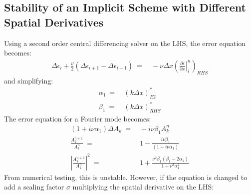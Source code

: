 \documentclass[conf]{new-aiaa}
\begin{document}
{\subsection{Stability of an Implicit Scheme with Different Spatial Derivatives}
{\label{sec:Appendix:Scaling_Fac}
%
Using a second order central differencing solver on the LHS, the error equation becomes:
\begin{equation}
	\begin{split}
		\label{eq:Error_Equation_LHS_neq_RHS}
  			\Delta{\epsilon_i}+\frac{\nu}{2}\left(\Delta{\epsilon_{i+1}}-\Delta{\epsilon_{i-1}}\right) ~=&~-{\nu}\Delta{x}\left(\left.\frac{\partial{\epsilon}}{\partial{x}}\right|_i^n\right)_{RHS}
	\end{split}
\end{equation}
and simplifying:
\begin{equation*}
	\begin{split}
  		\alpha_1~=&~\left(k\Delta{x}\right)^*_{E2} \\
  		\beta_1~=&~\left(k\Delta{x}\right)^*_{RHS}
	\end{split}
\end{equation*}
The error equation for a Fourier mode becomes:
\begin{equation}
	\begin{split}
		\label{eq:Fourier_Mode_LHS_neq_RHS}
  			(1+i\nu\alpha_1)\Delta{A_k}~=&~-i\nu\beta_1{A_k^n} \\
  			\frac{A_k^{n+1}}{A_k^{n}}~=&~1-\frac{i\nu\beta_1}{\left(1+i\nu\alpha_1\right)}\\
  			\left|\frac{A_k^{n+1}}{A_k^{n}} \right|^2~=&~1+\frac{\nu^2\beta_1\left(\beta_1-2\alpha_1\right)}{1+\nu^2\alpha_1^2}
	\end{split}
\end{equation}
From numerical testing, this is unstable. However, if the equation is changed to add a scaling factor $\sigma$ multiplying the spatial derivative on the LHS:

}}
\end{document}

